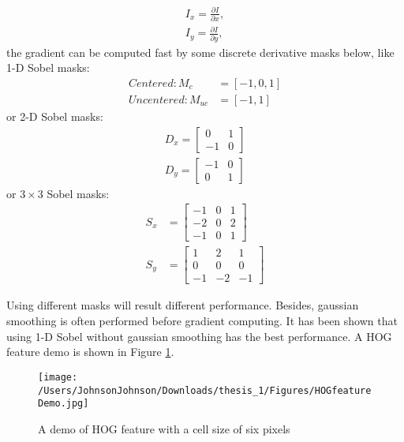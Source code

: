 \begin{equation}
\begin{aligned}
I_x = \frac{\partial I}{\partial x},\\
I_y = \frac{\partial I}{\partial y},
\end{aligned}
\end{equation}
the gradient can be computed fast by some discrete derivative masks below, like 1-D Sobel masks:
\begin{equation}
\begin{aligned}
Centered: M_{c} &= [-1, 0, 1]\\
Uncentered: M_{uc}& = [-1, 1]
\end{aligned}
\end{equation}
or 2-D Sobel masks:
\begin{equation}
\begin{aligned}
D_x = \left[ \begin{matrix}
0 & 1 \\
-1& 0
\end{matrix}
\right]\\
D_y = \left[ \begin{matrix}
-1 & 0 \\
0& 1
\end{matrix}
\right]
\end{aligned}
\end{equation}
or $3\times 3$ Sobel masks:
\begin{equation}
\begin{aligned}
S_x &= \left[ \begin{matrix}
-1 &0 & 1 \\
-2& 0 & 2\\
-1 &0 & 1 
\end{matrix}
\right]\\
S_y &= \left[ \begin{matrix}
1 & 2 &1 \\
0& 0 & 0\\
-1 & -2 &-1
\end{matrix}
\right]
\end{aligned}
\end{equation}

Using different masks will result different performance. Besides, gaussian smoothing is often performed before gradient computing. It has been shown that using 1-D Sobel without gaussian smoothing has the best performance. A HOG feature demo is shown in Figure \ref{fig:HOGdemo}.
\begin{figure}[H]
\centering
\texttt{[image: /Users/JohnsonJohnson/Downloads/thesis\_1/Figures/HOGfeatureDemo.jpg]}
\caption{A demo of HOG feature with a cell size of six pixels}
\label{fig:HOGdemo} 
\vspace{0em}
\end{figure}


